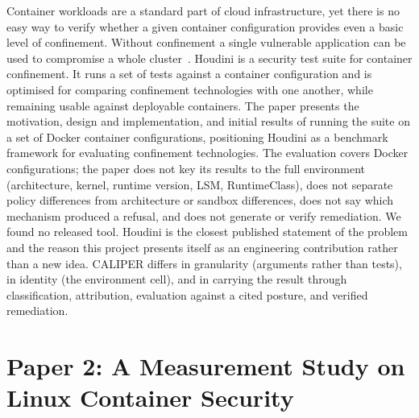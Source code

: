  Container workloads are a standard part of cloud infrastructure, yet there is no easy way to verify whether a given container configuration provides even a basic level of confinement. Without confinement a single vulnerable application can be used to compromise a whole cluster~\cite{houdini}.
 Houdini is a security test suite for container confinement. It runs a set of tests against a container configuration and is optimised for comparing confinement technologies with one another, while remaining usable against deployable containers.
 The paper presents the motivation, design and implementation, and initial results of running the suite on a set of Docker container configurations, positioning Houdini as a benchmark framework for evaluating confinement technologies.
 The evaluation covers Docker configurations; the paper does not key its results to the full environment (architecture, kernel, runtime version, LSM, RuntimeClass), does not separate policy differences from architecture or sandbox differences, does not say which mechanism produced a refusal, and does not generate or verify remediation. We found no released tool.
 Houdini is the closest published statement of the problem and the reason this project presents itself as an engineering contribution rather than a new idea. CALIPER differs in granularity (arguments rather than tests), in identity (the environment cell), and in carrying the result through classification, attribution, evaluation against a cited posture, and verified remediation.

\section{Paper 2: A Measurement Study on Linux Container Security}
\label{lit:lin}

